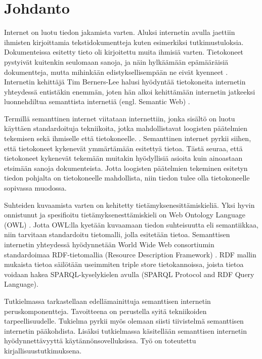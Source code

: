 \documentclass[finnish, 12pt, a4paper, elec, utf8, pdfa, online]{aaltothesis}
\begin{document}
\section{Johdanto}

\thispagestyle{empty}
Internet on luotu tiedon jakamista varten. Aluksi internetin avulla jaettiin ihmisten kirjoittamia tekstidokumentteja kuten esimerkiksi tutkimustuloksia. Dokumenteissa esitetty tieto oli kirjoitettu muita ihmisiä varten. Tietokoneet pystyivät kuitenkin seulomaan sanoja, ja näin hylkäämään epämääräisiä dokumentteja, mutta mihinkään edistyksellisempään ne eivät kyenneet \cite{WWW}. Internetin kehittäjä Tim Berners-Lee halusi hyödyntää tietokoneita internetin yhteydessä entistäkin enemmän, joten hän alkoi kehittämään internetin jatkeeksi luonnehdiltua semanttista internetiä (engl. Semantic Web) \cite{Berners_visio}.

Termillä semanttinen internet viitataan internettiin, jonka sisältö on luotu käyttäen standardoituja tekniikoita, jotka mahdollistavat loogisten päätelmien tekemisen sekä ihmiselle että tietokoneelle. \cite{Berners_visio}. Semanttinen internet pyrkii siihen, että tietokoneet kykenevät ymmärtämään esitettyä tietoa. Tästä seuraa, että tietokoneet kykenevät tekemään muitakin hyödyllisiä asioita kuin ainoastaan etsimään sanoja dokumenteista. Jotta loogisten päätelmien tekeminen esitetyn tiedon pohjalta on tietokoneelle mahdollista, niin tiedon tulee olla tietokoneelle sopivassa muodossa.

Suhteiden kuvaamista varten on kehitetty tietämyksenesittämiskieliä. Yksi hyvin onnistunut ja spesifioitu tietämyksenesttämiskieli on Web Ontology Language (OWL) \cite{OWL_specification}. Jotta OWL:lla kyetään kuvaamaan tiedon suhteisuutta eli semantiikkaa, niin tarvitaan standardoitu tietomalli, jolla esitetään tietoa. Semanttisen internetin yhteydessä hyödynnetään World Wide Web consortiumin standardoimaa RDF-tietomallia (Resource Description Framework) \cite{RDF_specification}. RDF mallin mukaista tietoa säilötään useimmiten triple store tietokannoissa, joista tietoa voidaan hakea SPARQL-kyselykielen avulla (SPARQL Protocol and RDF Query Language).

Tutkielmassa tarkastellaan edellämainittuja semanttisen internetin peruskomponentteja. Tavoitteena on perustella syitä tekniikoiden tarpeellisuudelle. Tukielma pyrkii myös olemaan siisti tiivistelmä semanttisen internetin pääkohdista. Lisäksi tutkielmassa käsitellään semanttisen internetin hyödynnettävyyttä käytännönsovelluksissa. Työ on toteutettu kirjallisuustutkimuksena.
\end{document}
